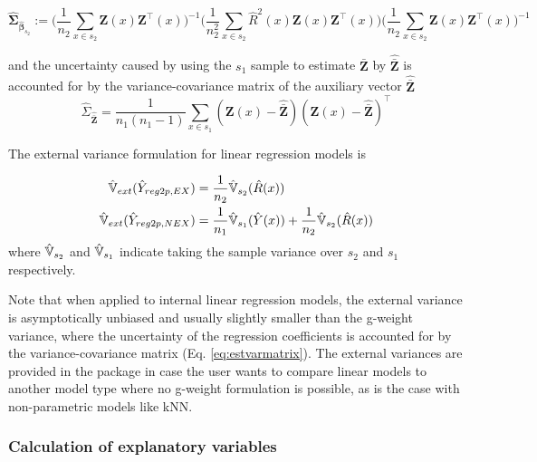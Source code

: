 \begin{equation}\label{eq:estvarmatrix}
  \hat{\pmb{\Sigma}}_{\hat{\pmb{\beta}}_{s_2}}:=\Big(\frac{1}{n_2}\sum_{x\in{s_2}}\pmb{Z}(x)\pmb{Z}^{\top}(x) \Big)^{-1}
  \Big(\frac{1}{n_2^2}\sum_{x\in{s_2}}\hat{R}^2(x)\pmb{Z}(x)\pmb{Z}^{\top}(x)\Big)
  \Big(\frac{1}{n_2}\sum_{x\in{s_2}}\pmb{Z}(x)\pmb{Z}^{\top}(x) \Big)^{-1}
\end{equation}

and the uncertainty caused by using the $s_1$ sample to estimate $\bar{\pmb{Z}}$ by $\hat{\bar{\pmb{Z}}}$ is accounted for by the variance-covariance matrix of the auxiliary vector $\hat{\bar{\pmb{Z}}}$
\begin{equation}\label{estvarcovaux}
\hat{\Sigma}_{\hat{\bar{\pmb{Z}}}}=
\frac{1}{n_{1}(n_{1}-1)}\sum_{x\in{s_{1}}}
(\pmb{Z}(x)-\hat{\bar{\pmb{Z}}})(\pmb{Z}(x)-\hat{\bar{\pmb{Z}}})^{\top}
\end{equation}

The external variance formulation for linear regression models is

\begin{subequations}\label{eq:varexternal_2p_reg}
\begin{align}
  \hat{\mathbb{V}}_{ext}(\hat{Y}_{reg2p,EX}) & = \frac{1}{n_2}\hat{\mathbb{V}}_{s_2}(\hat{R}(x)) \label{eq:varexternal_2p_reg_ex} \\
  \hat{\mathbb{V}}_{ext}(\hat{Y}_{reg2p,NEX}) & = \frac{1}{n_1}\hat{\mathbb{V}}_{s_1}(\hat{Y}(x)) + \frac{1}{n_2}\hat{\mathbb{V}}_{s_2}(\hat{R}(x)) \nonumber  \label{eq:varexternal_2p_reg_nex}
\end{align}
\end{subequations}
where $\hat{\mathbb{V}}_{s_2}$ and $\hat{\mathbb{V}}_{s_1}$ indicate taking the sample variance over $s_2$ and $s_1$ respectively.

Note that when applied to internal linear regression models, the external variance is asymptotically unbiased and usually slightly smaller than the g-weight variance, where the uncertainty of the regression coefficients is accounted for by the variance-covariance matrix (Eq. \ref{eq:estvarmatrix}).  The external variances are provided in the package  in case the user wants to compare linear models to another model type where no g-weight formulation is possible, as is the case with non-parametric models like kNN.

\subsubsection{Calculation of explanatory variables}

